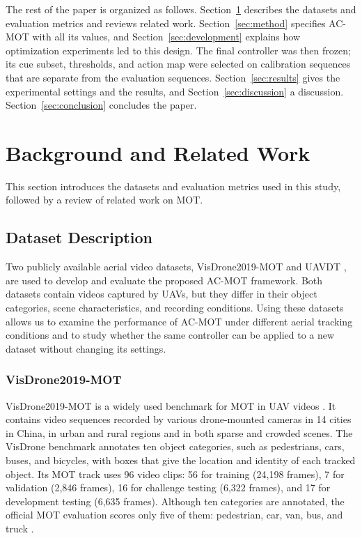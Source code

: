 \documentclass[journal]{new-aiaa}
\begin{document}
The rest of the paper is organized as follows. Section~\ref{sec:related}
describes the datasets and evaluation metrics and reviews related work.
Section~\ref{sec:method} specifies AC-MOT with all its values, and
Section~\ref{sec:development} explains how optimization experiments led to
this design. The final controller was then frozen; its cue subset,
thresholds, and action map were selected on calibration sequences that are
separate from the evaluation sequences.
Section~\ref{sec:results} gives the experimental settings and the results,
and Section~\ref{sec:discussion} a discussion. Section~\ref{sec:conclusion} concludes the paper.
\section{Background and Related Work}\label{sec:related}
This section introduces the datasets and evaluation metrics used in this study, followed by a review of related work on MOT.

\subsection{Dataset Description}\label{sec:datasets}
Two publicly available aerial video datasets, VisDrone2019-MOT
\cite{zhu2022visdrone} and UAVDT \cite{du2018uavdt}, are used to develop and evaluate the proposed AC-MOT framework. Both datasets contain videos captured by UAVs, but they differ in their object categories, scene characteristics, and recording conditions. Using these datasets allows us to examine the performance of AC-MOT under different aerial tracking conditions and to study whether the same controller can be applied to a new dataset without changing its settings.

\subsubsection{VisDrone2019-MOT}
VisDrone2019-MOT is a widely used benchmark for MOT in UAV
videos \cite{zhu2022visdrone}. It contains video sequences recorded by various
drone-mounted cameras in 14 cities in China, in urban and rural regions and in
both sparse and crowded scenes. The VisDrone benchmark annotates ten object
categories, such as pedestrians, cars, buses, and bicycles, with boxes that
give the location and identity of each tracked object. Its MOT track uses
96 video clips: 56 for training (24,198 frames), 7 for validation (2,846
frames), 16 for challenge testing (6,322 frames), and 17 for development
testing (6,635 frames). Although ten categories are annotated, the official
MOT evaluation scores only five of them: pedestrian, car, van, bus, and truck
\cite{zhu2022visdrone}.
\end{document}
